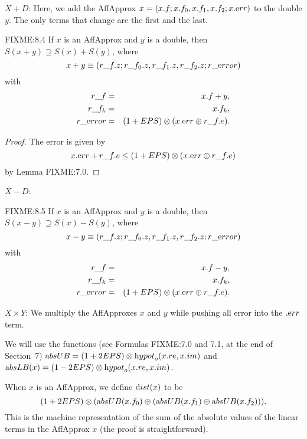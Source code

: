 $X + D$: 
Here, we add the AffApprox $x = (x.f; x.f_0,x.f_1,x.f_2; x.{\textrm err})$  to the double $y$.  The only terms that change are the first and the last.

\begin{proposition}{FIXME:8.4}\hskip-8pt If $x$ is an 
{\textrm AffApprox}  and $y$ is a double{\textrm ,} 
then $S(x + y) \supseteq S(x) + S(y)${\textrm ,} where
$$x + y \equiv (r\_f.z; r\_f_0.z, r\_f_1.z, r\_f_2.z; r\_{\textrm error})$$
with
\begin{eqnarray*}
r\_f& =& x.f + y,\\
r\_f_k &=& x.f_k,\\
r\_{\textrm error}& = &(1 + EPS) \otimes (x.{\textrm err} \oplus r\_f.e).\end{eqnarray*}
\end{proposition}

\begin{proof}{}
The error is given by 
$$x.{\textrm err} + r\_f.e \le (1 + EPS) \otimes (x.{\textrm err} \oplus r\_f.e)$$
by Lemma FIXME:7.0. \end{proof}

$X - D$:
\begin{proposition}{FIXME:8.5}\hskip-8pt If $x$ is an 
{\textrm AffApprox}  and $y$ is a double{\textrm ,}
then $S(x - y) \supseteq S(x) - S(y)${\textrm ,} where
$$x - y \equiv (r\_f.z; r\_f_0.z, r\_f_1.z, r\_f_2.z; r\_{\textrm error})$$
with
\begin{eqnarray*}
r\_f &= &x.f - y,\\
r\_f_k &=& x.f_k,\\
r\_{\textrm error}& =& (1 + EPS) \otimes (x.{\textrm err} \oplus r\_f.e).\end{eqnarray*}
\end{proposition}

$X \times Y$: 
We multiply the AffApproxes $x$ and $y$ while pushing all error into the $.{\textrm err}$ term.

We will use the functions (see Formulas FIXME:7.0 and 7.1, at the end of Section~7) ${\textrm absUB}= (1 + 2EPS) \otimes
{\textrm hypot}_o(x.re,x.im)$ and 
${\textrm absLB}(x) = (1 - 2EPS) \otimes {\textrm hypot}_o(x.re,x.im)$.

When $x$ is an AffApprox, we define ${\textrm dist}(x)$ to be $$(1 + 2EPS) \otimes ({\textrm absUB}(x.f_0) \oplus ({\textrm absUB}(x.f_1) \oplus {\textrm absUB}(x.f_2))).$$  This is the machine representation of the sum of the absolute values of the linear terms in the AffApprox $x$ 
(the proof is straightforward).

